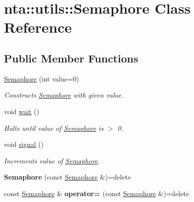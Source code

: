 \hypertarget{classnta_1_1utils_1_1Semaphore}{}\section{nta\+:\+:utils\+:\+:Semaphore Class Reference}
\label{classnta_1_1utils_1_1Semaphore}
\subsection*{Public Member Functions}
\begin{DoxyCompactItemize}
\item 
\mbox{\label{classnta_1_1utils_1_1Semaphore_ae01dc768910e74be62cbc81765693f44}} 
\hyperlink{classnta_1_1utils_1_1Semaphore_ae01dc768910e74be62cbc81765693f44}{Semaphore} (int value=0)
\begin{DoxyCompactList}\small\item\em Constructs \hyperlink{classnta_1_1utils_1_1Semaphore}{Semaphore} with given value. \end{DoxyCompactList}\item 
\mbox{\label{classnta_1_1utils_1_1Semaphore_a252683ad84d75e12d30f29441f7178bc}} 
void \hyperlink{classnta_1_1utils_1_1Semaphore_a252683ad84d75e12d30f29441f7178bc}{wait} ()
\begin{DoxyCompactList}\small\item\em Halts until value of \hyperlink{classnta_1_1utils_1_1Semaphore}{Semaphore} is $>$ 0. \end{DoxyCompactList}\item 
\mbox{\label{classnta_1_1utils_1_1Semaphore_ac80b0637a59c63cf9c553954c6cd0be9}} 
void \hyperlink{classnta_1_1utils_1_1Semaphore_ac80b0637a59c63cf9c553954c6cd0be9}{signal} ()
\begin{DoxyCompactList}\small\item\em Increments value of \hyperlink{classnta_1_1utils_1_1Semaphore}{Semaphore}. \end{DoxyCompactList}\item 
\mbox{\label{classnta_1_1utils_1_1Semaphore_ad21972675a3dcc4c1876384ddd225fde}} 
{\bfseries Semaphore} (const \hyperlink{classnta_1_1utils_1_1Semaphore}{Semaphore} \&)=delete
\item 
\mbox{\label{classnta_1_1utils_1_1Semaphore_afa2313271f3a4572f5dc8e79dff7a41f}} 
const \hyperlink{classnta_1_1utils_1_1Semaphore}{Semaphore} \& {\bfseries operator=} (const \hyperlink{classnta_1_1utils_1_1Semaphore}{Semaphore} \&)=delete
\end{DoxyCompactItemize}
